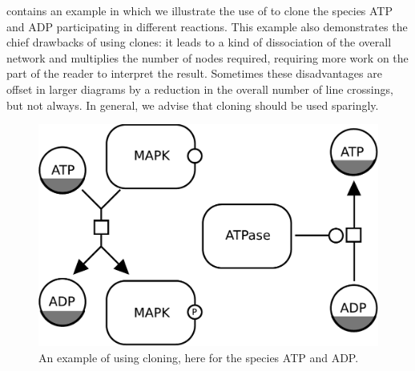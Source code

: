  contains an example in which we illustrate the use of  to clone the species ATP and ADP participating in different reactions.  This example also demonstrates the chief drawbacks of using clones: it leads to a kind of dissociation of the overall network and multiplies the number of nodes required, requiring more work on the part of the reader to interpret the result.  Sometimes these disadvantages are offset in larger diagrams by a reduction in the overall number of line crossings, but not always.  In general, we advise that cloning should be used sparingly.

\begin{figure}[H]
  \centering
  \includegraphics[scale = 0.5]{examples/cloning}
  \caption{An example of using cloning, here for the species ATP and ADP.}
  \label{fig:example-cloning}
\end{figure}




